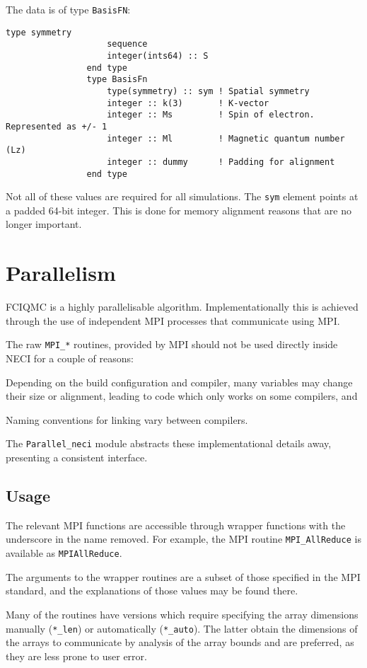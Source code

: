 \documentclass[a4paper,notitlepage]{scrreprt}
\newenvironment{packed_itemize}{
	\begin{itemize}
		\setlength{\itemsep}{1pt}
		\setlength{\parskip}{0pt}
		\setlength{\parsep}{0pt}
	}{\end{itemize}}
\let\code\lstinline
\begin{document}
{{{\begin{description}
			The data is of type \code{BasisFN}:
			\begin{lstlisting}[gobble=12]
				type symmetry
					sequence
					integer(ints64) :: S
				end type
				type BasisFn
					type(symmetry) :: sym ! Spatial symmetry
					integer :: k(3)       ! K-vector
					integer :: Ms         ! Spin of electron. Represented as +/- 1
					integer :: Ml         ! Magnetic quantum number (Lz)
					integer :: dummy      ! Padding for alignment
				end type
			\end{lstlisting}
			Not all of these values are required for all simulations. The
			\code{sym} element points at a padded 64-bit integer. This
			is done for memory alignment reasons that are no longer important.
	\end{description}

\section{Parallelism}
	FCIQMC is a highly parallelisable algorithm. Implementationally this is
	achieved through the use of independent MPI processes that communicate
	using MPI.

	The raw \code{MPI_*} routines, provided by MPI should not be used directly
	inside NECI for a couple of reasons:
	\begin{packed_itemize}
		\item
			Depending on the build configuration and compiler, many variables
			may change their size or alignment, leading to code which only
			works on some compilers, and
		\item
			Naming conventions for linking vary between compilers.
	\end{packed_itemize}
	The \code{Parallel_neci} module abstracts these implementational details
	away, presenting a consistent interface.

\subsection{Usage}
	The relevant MPI functions are accessible through wrapper functions with the
	underscore in the name removed. For example, the MPI routine
	\code{MPI_AllReduce} is available as \code{MPIAllReduce}.

	The arguments to the wrapper routines are a subset of those specified in the
	MPI standard, and the explanations of those values may be found there.

	Many of the routines have versions which require specifying the array
	dimensions manually (\code{*_len}) or automatically (\code{*_auto}). The
	latter obtain the dimensions of the arrays to communicate by analysis of
	the array bounds and are preferred, as they are less prone to user error.

}}}
\end{document}
